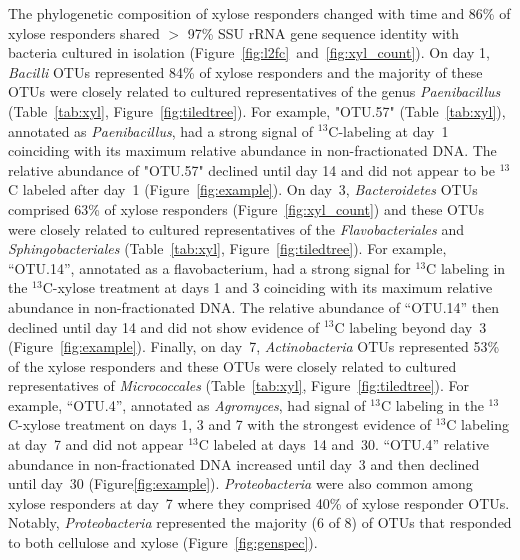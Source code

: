 The phylogenetic composition of xylose responders changed with time and 86\% of
xylose responders shared $>$ 97\% SSU rRNA gene sequence identity with bacteria
cultured in isolation (Figure~\ref{fig:l2fc}~and~\ref{fig:xyl_count}). On day
1, \textit{Bacilli} OTUs represented 84\% of xylose responders and the majority
of these OTUs were closely related to cultured representatives of the genus
\textit{Paenibacillus} (Table~\ref{tab:xyl}, Figure~\ref{fig:tiledtree}). For
example, "OTU.57" (Table~\ref{tab:xyl}), annotated as \textit{Paenibacillus},
had a strong signal of $^{13}$C-labeling at day~1 coinciding with its maximum
relative abundance in non-fractionated DNA. The relative abundance of "OTU.57"
declined until day 14 and did not appear to be $^{13}$C labeled after day~1
(Figure~\ref{fig:example}). On day~3, \textit{Bacteroidetes} OTUs comprised
63\% of xylose responders (Figure~\ref{fig:xyl_count}) and these OTUs were
closely related to cultured representatives of the \textit{Flavobacteriales}
and \textit{Sphingobacteriales} (Table~\ref{tab:xyl},
Figure~\ref{fig:tiledtree}). For example, ``OTU.14'', annotated as
a flavobacterium, had a strong signal for $^{13}$C labeling in the
$^{13}$C-xylose treatment at days 1 and 3 coinciding with its maximum relative
abundance in non-fractionated DNA. The relative abundance of ``OTU.14'' then
declined until day 14 and did not show evidence of $^{13}$C labeling beyond
day~3 (Figure~\ref{fig:example}). Finally, on day~7, \textit{Actinobacteria}
OTUs represented 53\% of the xylose responders and these OTUs were closely
related to cultured representatives of \textit{Micrococcales}
(Table~\ref{tab:xyl}, Figure~\ref{fig:tiledtree}). For example, ``OTU.4'',
annotated as \textit{Agromyces}, had signal of $^{13}$C labeling in the
$^{13}$C-xylose treatment on days 1,
3 and 7 with the strongest evidence of $^{13}$C labeling at day~7 and did not
appear $^{13}$C labeled at days~14 and~30. ``OTU.4'' relative abundance in
non-fractionated DNA increased until day~3 and then declined until
day~30 (Figure\ref{fig:example}). \textit{Proteobacteria} were also common
among xylose responders at day~7 where they comprised 40\% of xylose responder
OTUs. Notably, \textit{Proteobacteria} represented the majority (6 of 8) of
OTUs that responded to both cellulose and xylose (Figure~\ref{fig:genspec}). 

